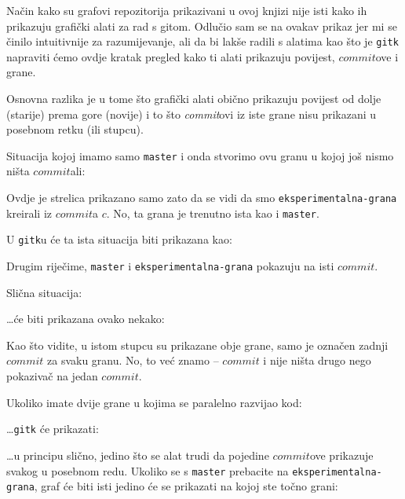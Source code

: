 
Način kako su grafovi repozitorija prikazivani u ovoj knjizi nije isti kako ih prikazuju grafički alati za rad s gitom.
Odlučio sam se na ovakav prikaz jer mi se činilo intuitivnije za razumijevanje, ali da bi lakše radili s alatima kao što je \verb+gitk+ napraviti ćemo ovdje kratak pregled kako ti alati prikazuju povijest, $commit$ove i grane.

Osnovna razlika je u tome što grafički alati obično prikazuju povijest od dolje (starije) prema gore (novije)
i to što \emph{commit}ovi iz iste grane nisu prikazani u posebnom retku (ili stupcu).


Situacija kojoj imamo samo \verb+master+ i onda stvorimo ovu granu u kojoj još nismo ništa $commit$ali:



Ovdje je strelica prikazano samo zato da se vidi da smo \verb+eksperimentalna-grana+ kreirali iz $commit$a $c$.
No, ta grana je trenutno ista kao i \verb+master+.

U \verb+gitk+u će ta ista situacija biti prikazana kao:


Drugim riječime, \verb+master+ i \verb+eksperimentalna-grana+ pokazuju na isti $commit$.

Slična situacija:



\dots{}će biti prikazana ovako nekako:


Kao što vidite, u istom stupcu su prikazane obje grane, samo je označen zadnji $commit$ za svaku granu.
No, to već znamo -- $commit$ i nije ništa drugo nego pokazivač na jedan $commit$.

Ukoliko imate dvije grane u kojima se paralelno razvijao kod:



\dots{}\verb+gitk+ će prikazati:


\dots{}u principu slično, jedino što se alat trudi da pojedine $commit$ove prikazuje svakog u posebnom redu.
Ukoliko se s \verb+master+ prebacite na \verb+eksperimentalna-grana+, graf će biti isti jedino će se prikazati na kojoj ste točno grani:

